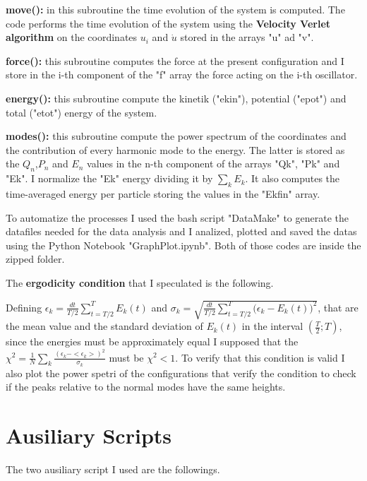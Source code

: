 \documentclass[10pt]{article}
\numberwithin{equation}{section}
\begin{document}
\textbf{move():} in this subroutine the time evolution of the system is computed. The code performs the time evolution of the system using the \textbf{Velocity Verlet algorithm} on the coordinates $u_i$ and $\dot{u}$ stored in the arrays "u" ad "v".

\textbf{force():} this subroutine computes the force at the present configuration and I store in the i-th component of the "f" array the force acting on the i-th oscillator.

\textbf{energy():} this subroutine compute the kinetik ("ekin"), potential ("epot") and total ("etot") energy of the system.

\textbf{modes():} this subroutine compute the power spectrum of the coordinates and the contribution of every harmonic mode to the energy. The latter is stored as the $Q_n$,$P_n$ and $E_n$ values in the n-th component of the arrays "Qk", "Pk" and "Ek". I normalize the "Ek" energy dividing it by $\sum_k E_k$. It also computes the time-averaged energy per particle storing the values in the "Ekfin" array.

To automatize the processes I used the bash script "DataMake" to generate the datafiles needed for the data analysis and I analized, plotted and saved the datas using the Python Notebook "GraphPlot.ipynb". Both of those codes are inside the zipped folder.


The \textbf{ergodicity condition} that I speculated is the following.

Defining $\epsilon_k = \frac{dt}{T/2} \sum_{t=T/2}^T  E_k (t) $ and $\sigma_k= \sqrt{ \frac{dt}{T/2}  \sum_{t=T/2}^T \big( \epsilon_k- E_k(t) \big)^2 }$, that are the mean value and the standard deviation of $E_k(t)$ in the interval $(\frac{T}{2};T)$, since the energies must be approximately equal I supposed that the $\chi^2= \frac{1}{N} \sum_k \frac{(\epsilon_k - <\epsilon_k>)^2}{\sigma_k}$ must be $\chi^2 <1$. 
To verify that this condition is valid I also plot the power spetri of the configurations that verify the condition to check if the peaks relative to the normal modes have the same heights.
\section{Ausiliary Scripts}

The two ausiliary script I used are the followings.
\end{document}
